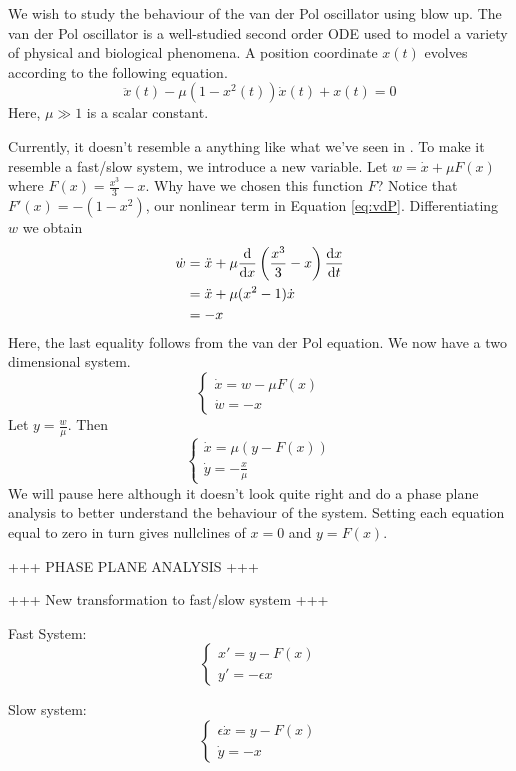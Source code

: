 We wish to study the behaviour of the van der Pol oscillator using blow up. The van der Pol oscillator is a well-studied second order ODE used to model a variety of physical and biological phenomena. A position coordinate \(x(t)\) evolves according to the following equation. 
\begin{equation} \label{eq:vdP}\ddot{x}(t)-\mu\left(1-x^2(t)\right)\dot{x}(t)+x(t)=0   \end{equation}
Here, \(\mu \gg 1\) is a scalar constant. \par 

Currently, it doesn't resemble a anything like what we've seen in \cite{krupa2001}. To make it resemble a fast/slow system, we introduce a new variable. Let \(w=\dot{x}+\mu F(x)\) where \(F(x)=\frac{x^3}{3}-x\). Why have we chosen this function \(F\)? Notice that \(F'(x)=-(1-x^2)\), our nonlinear term in Equation \ref{eq:vdP}. Differentiating \(w\) we obtain
\begin{align*}
    \dot{w}&=\ddot{x}+\mu\od{}{x}\left(\frac{x^3}{3}-x\right)\od{x}{t}\\
    & =\ddot{x}+\mu(x^2-1)\dot{x}\\
    &= -x
\end{align*}
Here, the last equality follows from the van der Pol equation. We now have a two dimensional system.
\[\begin{cases} \dot{x}=w-\mu F(x)\\
 \dot{w}=-x\end{cases}\]
 Let \(y=\frac{w}{\mu}\). Then
 \[\begin{cases} \dot{x}=\mu\left(y-F(x)\right)\\
 \dot{y}=-\frac{x}{\mu}\end{cases}\]
We will pause here although it doesn't look quite right and do a phase plane analysis to better understand the behaviour of the system. Setting each equation equal to zero in turn gives nullclines of \(x=0\) and \(y=F(x)\). 

+++ PHASE PLANE ANALYSIS +++

+++ New transformation to fast/slow system +++


Fast System:
\begin{equation}\label{fastsystem}
    \begin{cases} x'=y-F(x)\\
    y'=-\epsilon x
    \end{cases}
\end{equation}


Slow system:
\begin{equation}\label{slowsystem}
    \begin{cases} \epsilon \dot{x}=y-F(x)\\
    \dot{y}=-x
    \end{cases}
\end{equation}

